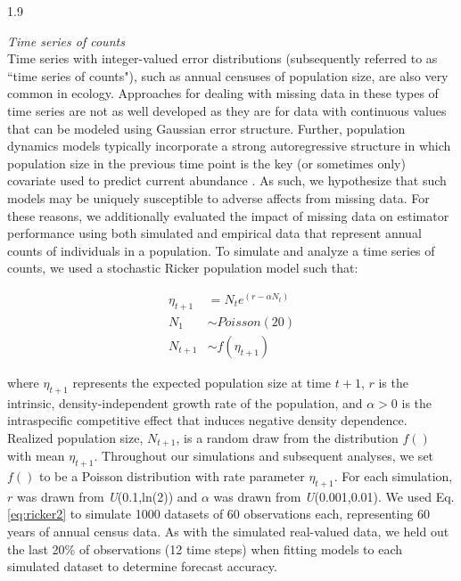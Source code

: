 \documentclass[12pt,english]{article} %
\begin{document}
\begin{linenumbers}
\begin{spacing}{1.9}
\begin{flushleft}
\textit{Time series of counts} \\
\noindent Time series with integer-valued error distributions (subsequently referred to as ``time series of counts"), such as annual censuses of population size, are also very common in ecology. Approaches for dealing with missing data in these types of time series are not as well developed as they are for data with continuous values that can be modeled using Gaussian error structure. Further, population dynamics models typically incorporate a strong autoregressive structure in which population size in the previous time point is the key (or sometimes only) covariate used to predict current abundance \citep{levin1976population}. As such, we hypothesize that such models may be uniquely susceptible to adverse affects from missing data. For these reasons, we additionally evaluated the impact of missing data on estimator performance using both simulated and empirical data that represent annual counts of individuals in a population. To simulate and analyze a time series of counts, we used a stochastic Ricker population model \citep{ricker1954stock, melbourne2008extinction} such that:

\vspace{-4em}

\begin{subequations}
\begin{align} \label{eq:ricker2}
    \eta_{t+1} &= N_t e^{(r - \alpha N_t)}\\
    N_1 &\sim Poisson(20) \\
    N_{t+1} &\sim f(\eta_{t+1})
\end{align}
\end{subequations}

\vspace{-1em}

\noindent where $\eta_{t+1}$ represents the expected population size at time $t+1$, $r$ is the intrinsic, density-independent growth rate of the population, and $\alpha > 0$ is the intraspecific competitive effect that induces negative density dependence. %
Realized population size, $N_{t+1}$, is a random draw from the distribution $f()$ with mean $\eta_{t+1}$. Throughout our simulations and subsequent analyses, we set $f()$ to be a Poisson distribution with rate parameter $\eta_{t+1}$. For each simulation, $r$ was drawn from \textit{U}(0.1,ln(2)) and $\alpha$ was drawn from  \textit{U}(0.001,0.01).%
We used Eq. \ref{eq:ricker2} to simulate 1000 datasets of 60 observations each, representing 60 years of annual census data. As with the simulated real-valued data, we held out the last 20\% of observations (12 time steps) when fitting models to each simulated dataset to determine forecast accuracy. 


\end{flushleft}
\end{spacing}
\end{linenumbers}
\end{document}
